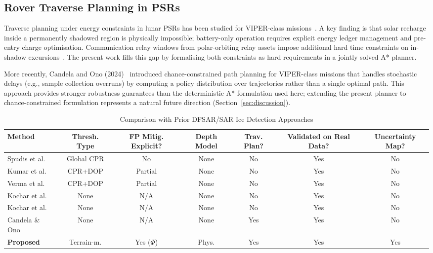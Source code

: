 \documentclass[10pt,conference]{IEEEtran}
\begin{document}
\subsection{Rover Traverse Planning in PSRs}

Traverse planning under energy constraints in lunar PSRs has been
studied for VIPER-class missions~\cite{colaprete2019viper}.
A key finding is that solar recharge inside a permanently shadowed
region is physically impossible; battery-only operation requires
explicit energy ledger management and pre-entry charge optimisation.
Communication relay windows from polar-orbiting relay assets
impose additional hard time constraints on in-shadow
excursions~\cite{nann2020relay}.
The present work fills this gap by formalising both constraints as
hard requirements in a jointly solved A* planner.

More recently, Candela and Ono (2024)~\cite{candela2024chance} introduced chance-constrained path planning for VIPER-class missions that handles stochastic delays (e.g., sample collection overruns) by computing a policy distribution over trajectories rather than a single optimal path. This approach provides stronger robustness guarantees than the deterministic A* formulation used here; extending the present planner to chance-constrained formulation represents a natural future direction (Section~\ref{sec:discussion}).

\begin{table}[htbp]
\caption{Comparison with Prior DFSAR/SAR Ice Detection Approaches}
\label{tab:comparison}
\centering
\small
\setlength{\tabcolsep}{4pt}
\begin{tabular}{p{3.5cm}cccccc}
\toprule
Method & Thresh. Type & FP Mitig. Explicit? & Depth Model & Trav. Plan? & Validated on Real Data? & Uncertainty Map? \\
\midrule
Spudis et al.~\cite{spudis2013mini}
  & Global CPR & No & None & No & Yes & No \\
Kumar et al.~\cite{kumar2022dfsar}
  & CPR+DOP & Partial & None & No & Yes & No \\
Verma et al.~\cite{verma2025dfsar}
  & CPR+DOP & Partial & None & No & Yes & No \\
Kochar et al.~\cite{kochar2022dielectric}
  & None & N/A & None & No & Yes & No \\
Kochar et al.~\cite{kochar2023roughness}
  & None & N/A & None & No & Yes & No \\
Candela \& Ono~\cite{candela2024chance}
  & None & N/A & None & Yes & Yes & No \\
\textbf{Proposed}
  & Terrain-m. & Yes ($\Phi$) & Phys. & Yes & Yes & Yes \\
\bottomrule
\end{tabular}
\end{table}
\end{document}
